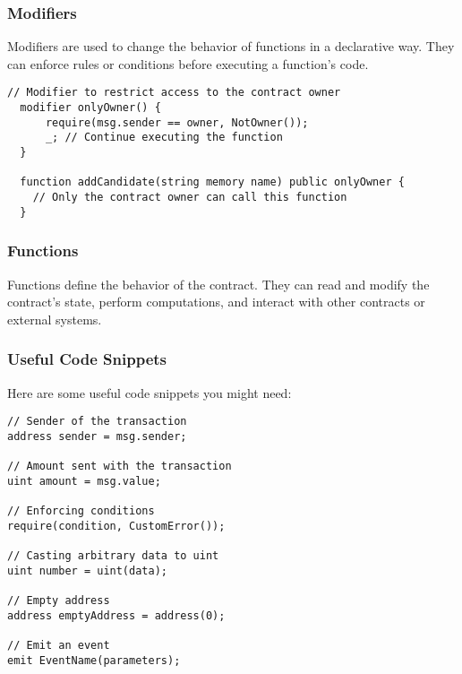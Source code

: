 \documentclass[12pt]{article}
\begin{document}
\subsubsection*{Modifiers}

Modifiers are used to change the behavior of functions in a declarative way. They can enforce rules or conditions before executing a function's code.

\noindent
\begin{minipage}[c]{\textwidth}
\begin{lstlisting}[language=Solidity]
  // Modifier to restrict access to the contract owner
  modifier onlyOwner() {
      require(msg.sender == owner, NotOwner());
      _; // Continue executing the function
  }

  function addCandidate(string memory name) public onlyOwner {
    // Only the contract owner can call this function
  }
\end{lstlisting}
\end{minipage}

\subsubsection*{Functions}

Functions define the behavior of the contract. They can read and modify the contract's state, perform computations, and interact with other contracts or external systems.

\subsubsection*{Useful Code Snippets}
Here are some useful code snippets you might need:

\noindent
\begin{minipage}[c]{\textwidth}
\begin{lstlisting}[language=Solidity]
// Sender of the transaction
address sender = msg.sender;

// Amount sent with the transaction
uint amount = msg.value;

// Enforcing conditions
require(condition, CustomError());

// Casting arbitrary data to uint
uint number = uint(data);

// Empty address
address emptyAddress = address(0);

// Emit an event
emit EventName(parameters);
\end{lstlisting}
\end{minipage}
\end{document}
